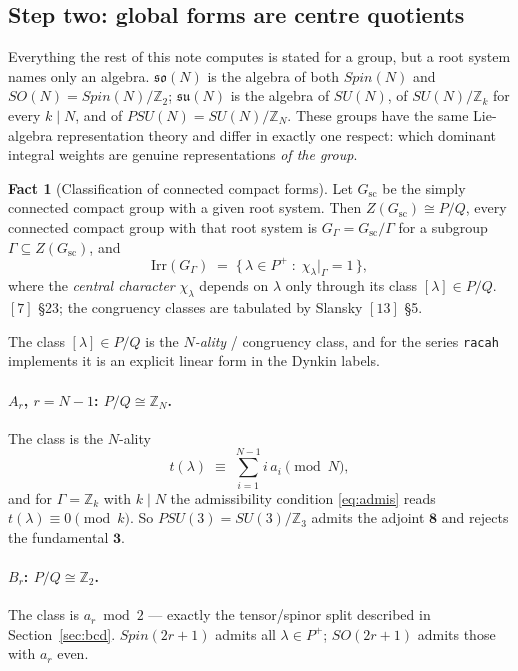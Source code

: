\documentclass[11pt,a4paper]{article}
\theoremstyle{plain}
\theoremstyle{definition}
\newtheorem{fact}[theorem]{Fact}
\newcommand{\su}{\mathfrak{su}}
\newcommand{\so}{\mathfrak{so}}
\newcommand{\Irr}{\mathrm{Irr}}
\newcommand{\ZZ}{\mathbb{Z}}
\newcommand{\code}[1]{\texttt{#1}}
\begin{document}
\subsection{Step two: global forms are centre quotients}

Everything the rest of this note computes is stated for a group, but a root
system names only an algebra. $\so(N)$ is the algebra of both $Spin(N)$ and
$SO(N)=Spin(N)/\ZZ_2$; $\su(N)$ is the algebra of $SU(N)$, of $SU(N)/\ZZ_k$ for
every $k\mid N$, and of $PSU(N)=SU(N)/\ZZ_N$. These groups have the same
Lie-algebra representation theory and differ in exactly one respect: which
dominant integral weights are genuine representations \emph{of the group}.


\begin{fact}[Classification of connected compact forms]\label{fact:forms}
Let $G_{\mathrm{sc}}$ be the simply connected compact group with a given root
system. Then $Z(G_{\mathrm{sc}}) \cong P/Q$, every connected compact group with
that root system is $G_\Gamma = G_{\mathrm{sc}}/\Gamma$ for a subgroup
$\Gamma\subseteq Z(G_{\mathrm{sc}})$, and
\begin{equation}\label{eq:admis}
  \Irr(G_\Gamma)
  \;=\; \bigl\{\, \lambda\in P^+ \;:\; \chi_\lambda\big|_\Gamma = 1 \,\bigr\},
\end{equation}
where the \emph{central character} $\chi_\lambda$ depends on $\lambda$ only
through its class $[\lambda]\in P/Q$. $[7]$ \S23; the congruency classes are
tabulated by Slansky $[13]$ \S5.
\end{fact}

The class $[\lambda]\in P/Q$ is the \emph{$N$-ality} / congruency class, and
for the series \code{racah} implements it is an explicit linear form in the
Dynkin labels.

\paragraph{$A_{r}$, $r=N-1$: $P/Q\cong\ZZ_N$.} The class is the $N$-ality
\begin{equation}\label{eq:nality}
  t(\lambda) \;\equiv\; \sum_{i=1}^{N-1} i\,a_i \pmod N ,
\end{equation}
and for $\Gamma = \ZZ_k$ with $k\mid N$ the admissibility condition
\eqref{eq:admis} reads $t(\lambda)\equiv 0 \pmod k$. So $PSU(3)=SU(3)/\ZZ_3$
admits the adjoint $\mathbf{8}$ and rejects the fundamental $\mathbf{3}$.

\paragraph{$B_r$: $P/Q\cong\ZZ_2$.} The class is $a_r \bmod 2$ --- exactly the
tensor/spinor split described in Section~\ref{sec:bcd}. $Spin(2r+1)$ admits all
$\lambda\in P^+$; $SO(2r+1)$ admits those with $a_r$ even.
\end{document}

